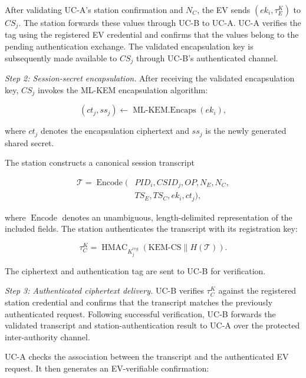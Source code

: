 \documentclass[twocolumn,10pt,journal]{IEEEtran}
\begin{document}
After validating UC-A's station confirmation and $N_C$,
the EV sends $(ek_i,\tau_E^{K})$ to $CS_j$. The station
forwards these values through UC-B to UC-A.
UC-A verifies the tag using the registered EV
credential and confirms that the values belong
to the pending authentication exchange.
The validated encapsulation key is subsequently
made available to $CS_j$ through UC-B's
authenticated channel.

\textit{Step 2: Session-secret encapsulation.}
After receiving the validated encapsulation key,
$CS_j$ invokes the ML-KEM encapsulation algorithm:

\begin{equation}
(ct_j,ss_j)
\leftarrow
\operatorname{ML\mbox{-}KEM.Encaps}(ek_i),
\label{eq:qsv2g_kem_encaps}
\end{equation}

where $ct_j$ denotes the encapsulation ciphertext
and $ss_j$ is the newly generated shared secret.

The station constructs a canonical session transcript

\begin{equation}
\begin{aligned}
\mathcal{T} =
\operatorname{Encode}(&PID_i,CSID_j,OP,N_E,N_C,\\
                     &TS_E,TS_C,ek_i,ct_j),
\end{aligned}
\label{eq:qsv2g_session_transcript}
\end{equation}

where $\operatorname{Encode}$ denotes an unambiguous,
length-delimited representation of the included
fields. The station authenticates the transcript
with its registration key:

\begin{equation}
\tau_C^{K}
=
\operatorname{HMAC}_{K_j^{reg}}
\left(
\mathrm{KEM\mbox{-}CS}\parallel H(\mathcal{T})
\right).
\label{eq:qsv2g_kem_cs_proof}
\end{equation}

The ciphertext and authentication tag are sent
to UC-B for verification.

\textit{Step 3: Authenticated ciphertext delivery.}
UC-B verifies $\tau_C^{K}$ against the registered
station credential and confirms that the transcript
matches the previously authenticated request.
Following successful verification, UC-B forwards
the validated transcript and station-authentication
result to UC-A over the protected inter-authority
channel.

UC-A checks the association between the transcript
and the authenticated EV request. It then generates
an EV-verifiable confirmation:
\end{document}
